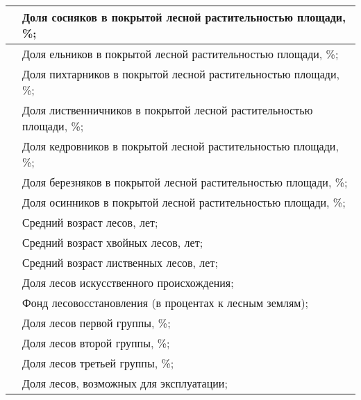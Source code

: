\documentclass{report}
\begin{document}
\begin{flushleft}
\begin{supertabular}{|m{3.7419999cm}|m{13.077001cm}|}
 &
{ Доля сосняков в покрытой лесной растительностью площади, \%;}\\\hline
{} &
{ Доля ельников в покрытой лесной растительностью площади, \%;}\\\hline
{} &
{ Доля пихтарников в покрытой лесной растительностью площади, \%;}\\\hline
{} &
{ Доля лиственничников в покрытой лесной растительностью площади, \%;}\\\hline
{} &
{ Доля кедровников в покрытой лесной растительностью площади, \%;}\\\hline
{} &
{ Доля березняков в покрытой лесной растительностью площади, \%;}\\\hline
{} &
{ Доля осинников в покрытой лесной растительностью площади, \%;}\\\hline
{} &
{ Средний возраст лесов, лет;}\\\hline
{} &
{ Средний возраст хвойных лесов, лет;}\\\hline
{} &
{ Средний возраст лиственных лесов, лет;}\\\hline
{} &
{ Доля лесов искусственного происхождения;}\\\hline
{} &
{ Фонд лесовосстановления (в процентах к лесным землям);}\\\hline
{} &
{ Доля лесов первой группы, \%;}\\\hline
{} &
{ Доля лесов второй группы, \%;}\\\hline
{} &
{ Доля лесов третьей группы, \%;}\\\hline
{} &
{ Доля лесов, возможных для эксплуатации;}\\\hline

\end{supertabular}
\end{flushleft}
\end{document}

